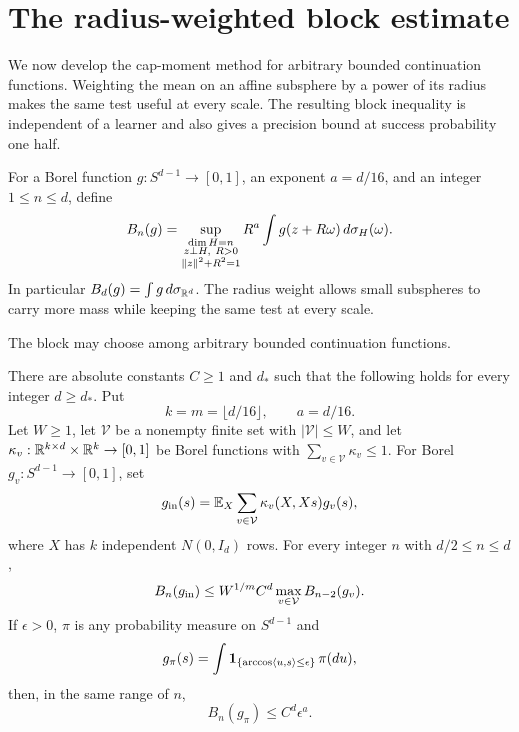 \section{The radius-weighted block estimate}\label{s:weighted-proof}

We now develop the cap-moment method for arbitrary bounded continuation
functions. Weighting the mean on an affine subsphere by a power of its
radius makes the same test useful at every scale. The resulting block
inequality is independent of a learner and also gives a precision bound
at success probability one half.

For a Borel function \(g:S^{d-1}\to[0,1]\), an exponent \(a=d/16\), and an integer
\(1\le n\le d\), define
\begin{equation}\label{s:weighted-norm}
 B_n(g)=\sup_{\substack{\dim H=n\\ z\perp H,\ R>0\\
                         \left\lVert z\right\rVert^2+R^2=1}}
 R^a\int g(z+R\omega)\,d\sigma_H(\omega).
\end{equation}
In particular \(B_d(g)=\int g\,d\sigma_{\mathbb R^d}\). The radius weight
allows small subspheres to carry more mass while keeping the same test
at every scale.

The block may choose among arbitrary bounded continuation functions.

\begin{theorem}\label{s:weighted-theorem}
There are absolute constants \(C\ge1\) and \(d_*\) such that the
following holds for every integer \(d\ge d_*\). Put
\[
 k=m=\lfloor d/16\rfloor,\qquad a=d/16.
\]
Let \(W\ge1\), let \(\mathcal V\) be a nonempty finite set with
\(|\mathcal V|\le W\), and let
\(\kappa_v:\mathbb R^{k\times d}\times\mathbb R^k\to[0,1]\) be Borel functions
with \(\sum_{v\in\mathcal V}\kappa_v\le1\). For Borel
\(g_v:S^{d-1}\to[0,1]\), set
\[
 g_{\rm in}(s)=
 \mathbb E_X\sum_{v\in\mathcal V}\kappa_v(X,Xs)g_v(s),
\]
where \(X\) has \(k\) independent \(N(0,I_d)\) rows. For every integer
\(n\) with \(d/2\le n\le d\),
\begin{equation}\label{s:weighted-block}
 B_n(g_{\rm in})
 \le W^{1/m}C^d\max_{v\in\mathcal V}B_{n-2}(g_v).
\end{equation}
If \(\epsilon>0\), \(\pi\) is any probability measure on \(S^{d-1}\) and
\[
 g_\pi(s)=\int\mathbf 1_{\{\arccos\langle u,s\rangle\le\epsilon\}}\,\pi(du),
\]
then, in the same range of \(n\),
\begin{equation}\label{s:weighted-terminal}
 B_n(g_\pi)\le C^d\epsilon^a.
\end{equation}
\end{theorem}

